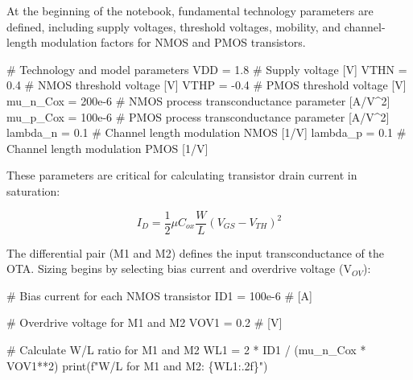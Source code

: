\documentclass[
  letterpaper,
]{scrbook}
\newenvironment{Shaded}{}{}
\newcommand{\BuiltInTok}[1]{\textcolor[rgb]{0.84,0.23,0.29}{#1}}
\newcommand{\CommentTok}[1]{\textcolor[rgb]{0.42,0.45,0.49}{#1}}
\newcommand{\DecValTok}[1]{\textcolor[rgb]{0.00,0.36,0.77}{#1}}
\newcommand{\FloatTok}[1]{\textcolor[rgb]{0.00,0.36,0.77}{#1}}
\newcommand{\NormalTok}[1]{\textcolor[rgb]{0.14,0.16,0.18}{#1}}
\newcommand{\OperatorTok}[1]{\textcolor[rgb]{0.14,0.16,0.18}{#1}}
\newcommand{\SpecialCharTok}[1]{\textcolor[rgb]{0.00,0.36,0.77}{#1}}
\newcommand{\SpecialStringTok}[1]{\textcolor[rgb]{0.01,0.18,0.38}{#1}}
\begin{document}
At the beginning of the notebook, fundamental technology parameters are
defined, including supply voltages, threshold voltages, mobility, and
channel-length modulation factors for NMOS and PMOS transistors.

\begin{Shaded}
\begin{Highlighting}[]
\CommentTok{\# Technology and model parameters}
\NormalTok{VDD }\OperatorTok{=} \FloatTok{1.8}     \CommentTok{\# Supply voltage [V]}
\NormalTok{VTHN }\OperatorTok{=} \FloatTok{0.4}    \CommentTok{\# NMOS threshold voltage [V]}
\NormalTok{VTHP }\OperatorTok{=} \OperatorTok{{-}}\FloatTok{0.4}   \CommentTok{\# PMOS threshold voltage [V]}
\NormalTok{mu\_n\_Cox }\OperatorTok{=} \FloatTok{200e{-}6}  \CommentTok{\# NMOS process transconductance parameter [A/V\^{}2]}
\NormalTok{mu\_p\_Cox }\OperatorTok{=} \FloatTok{100e{-}6}  \CommentTok{\# PMOS process transconductance parameter [A/V\^{}2]}
\NormalTok{lambda\_n }\OperatorTok{=} \FloatTok{0.1}     \CommentTok{\# Channel length modulation NMOS [1/V]}
\NormalTok{lambda\_p }\OperatorTok{=} \FloatTok{0.1}     \CommentTok{\# Channel length modulation PMOS [1/V]}
\end{Highlighting}
\end{Shaded}

These parameters are critical for calculating transistor drain current
in saturation:

\[
I_D = \frac{1}{2} \mu C_{ox} \frac{W}{L} (V_{GS} - V_{TH})^2 
\]

The differential pair (M1 and M2) defines the input transconductance of
the OTA. Sizing begins by selecting bias current and overdrive voltage
(V\(_{OV}\)):

\begin{Shaded}
\begin{Highlighting}[]
\CommentTok{\# Bias current for each NMOS transistor}
\NormalTok{ID1 }\OperatorTok{=} \FloatTok{100e{-}6}   \CommentTok{\# [A]}

\CommentTok{\# Overdrive voltage for M1 and M2}
\NormalTok{VOV1 }\OperatorTok{=} \FloatTok{0.2}     \CommentTok{\# [V]}

\CommentTok{\# Calculate W/L ratio for M1 and M2}
\NormalTok{WL1 }\OperatorTok{=} \DecValTok{2} \OperatorTok{*}\NormalTok{ ID1 }\OperatorTok{/}\NormalTok{ (mu\_n\_Cox }\OperatorTok{*}\NormalTok{ VOV1}\OperatorTok{**}\DecValTok{2}\NormalTok{)}
\BuiltInTok{print}\NormalTok{(}\SpecialStringTok{f"W/L for M1 and M2: }\SpecialCharTok{\{}\NormalTok{WL1}\SpecialCharTok{:.2f\}}\SpecialStringTok{"}\NormalTok{)}
\end{Highlighting}
\end{Shaded}
\end{document}
